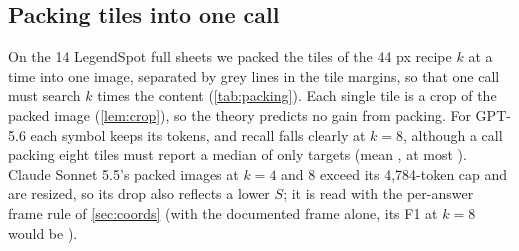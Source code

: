 \subsection{Packing tiles into one call}
\label{sec:packing}

On the 14 LegendSpot full sheets we packed the tiles of the 44 px recipe $k$ at a time into one image, separated by grey lines in the tile margins, so that one call must search $k$ times the content (\cref{tab:packing}). Each single tile is a crop of the packed image (\cref{lem:crop}), so the theory predicts no gain from packing. For GPT-5.6 each symbol keeps its tokens, and recall falls clearly at $k = 8$, although a call packing eight tiles must report a median of only \CpackMedian{} targets (mean \CpackMean, at most \CpackMax). Claude Sonnet 5.5's packed images at $k = 4$ and 8 exceed its 4{,}784-token cap and are resized, so its drop also reflects a lower $S$; it is read with the per-answer frame rule of \cref{sec:coords} (with the documented frame alone, its F1 at $k = 8$ would be \XmosRegFsonnetFiveFivekEight).

